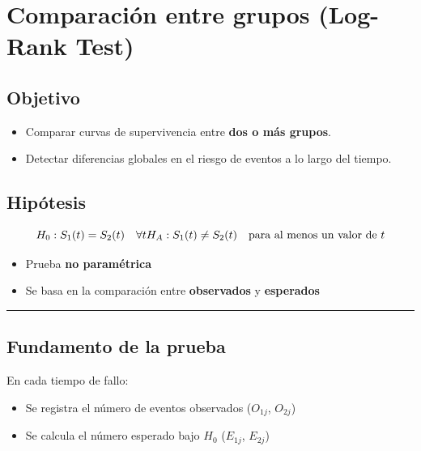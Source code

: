 \documentclass[
]{article}
\providecommand{\tightlist}{%
  \setlength{\itemsep}{0pt}\setlength{\parskip}{0pt}}
\begin{document}
\section{Comparación entre grupos (Log-Rank
Test)}\label{comparaciuxf3n-entre-grupos-log-rank-test}

\subsection{Objetivo}\label{objetivo}

\begin{itemize}
\tightlist
\item
  Comparar curvas de supervivencia entre \textbf{dos o más grupos}.
\item
  Detectar diferencias globales en el riesgo de eventos a lo largo del
  tiempo.
\end{itemize}

\subsection{Hipótesis}\label{hipuxf3tesis}

\[
H_0: S_1(t) = S_2(t) \quad \forall t \\
H_A: S_1(t) \ne S_2(t) \quad \text{para al menos un valor de } t
\]

\begin{itemize}
\tightlist
\item
  Prueba \textbf{no paramétrica}
\item
  Se basa en la comparación entre \textbf{observados} y
  \textbf{esperados}
\end{itemize}

\begin{center}\rule{0.5\linewidth}{0.5pt}\end{center}

\subsection{Fundamento de la prueba}\label{fundamento-de-la-prueba}

En cada tiempo de fallo:

\begin{itemize}
\tightlist
\item
  Se registra el número de eventos observados (\(O_{1j}\), \(O_{2j}\))
\item
  Se calcula el número esperado bajo \(H_0\) (\(E_{1j}\), \(E_{2j}\))
\end{itemize}
\end{document}
